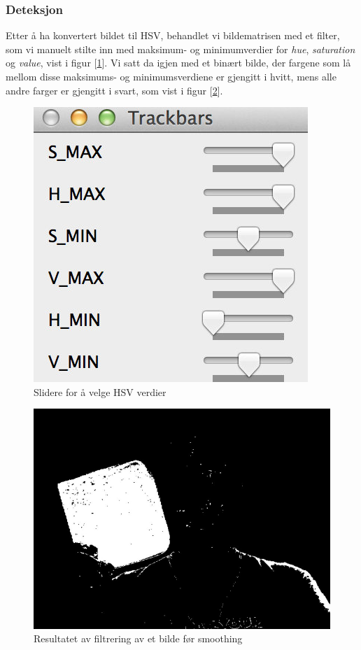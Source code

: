 \subsubsection{Deteksjon}

Etter å ha konvertert bildet til HSV, behandlet vi bildematrisen med et filter, som vi manuelt stilte inn med maksimum- og minimumverdier for \emph{hue}, \emph{saturation} og \emph{value}, vist i figur [\ref{fig:sliders}]. Vi satt da igjen med et binært bilde, der fargene som lå mellom disse maksimums- og minimumsverdiene er gjengitt i hvitt, mens alle andre farger er gjengitt i svart, som vist i figur [\ref{fig:firstiterationbinary}].

\begin{figure}[h!]
	\centering
	\includegraphics[scale=0.45]{img/sliders.jpg}
	\caption{Slidere for å velge HSV verdier}
	\label{fig:sliders}
\end{figure}

\begin{figure}[h!]
	\centering
	\includegraphics[scale=0.45]{img/first-binary.jpg}
	\caption[Første iterasjon binært bilde]{Resultatet av filtrering av et bilde før smoothing}
	\label{fig:firstiterationbinary}
\end{figure}

